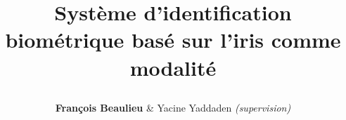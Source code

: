\title{\parbox{0.76\linewidth}{\centering Système d'identification biométrique basé sur l'iris comme modalité}}

\author{
\textbf{François Beaulieu}
\& 
Yacine Yaddaden \textit{(supervision)} %
}

